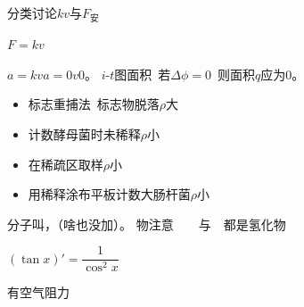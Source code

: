 分类讨论\quad $kv$与$F_{\text{安}}$


$F=kv$



$a=kv$\qquad $a=0$\qquad $v$$0$。
$i$-$t$图面积\ 若$\Delta\phi=0$\ 则面积$q$应为$0$。
\begin{itemize}
\item 标志重捕法\ 标志物脱落\quad $\rho$大
\item 计数酵母菌时未稀释\quad $\rho$小
\item 在稀疏区取样\quad $\rho$小
\item 用稀释涂布平板计数大肠杆菌\quad $\rho$小
\end{itemize}
分子叫，（啥也没加）。
物注意\ \ \ \ 与\ \ 都是氢化物

$(\tan x)'=\dfrac{1}{\cos^2 x}$

有空气阻力

